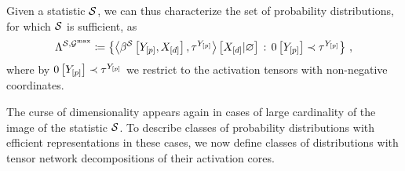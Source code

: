 Given a statistic $\mathcal{S}$, we can thus characterize the set of probability distributions, for which $\mathcal{S}$ is sufficient, as
\begin{align*} %
    \realizabledistsof{\sstat,\maxgraph}
    \coloneqq \left\{\normalizationof{\bencodingofat{\sstat}{\headvariables,\shortcatvariables},\hypercoreof{\headvariables}}{\shortcatvariables}
    \wcols \zerosat{\headvariables}\prec\hypercoreof{\headvariables} \right\} \, ,
\end{align*}
where by $0\left[Y_{[p]}\right]\prec\tau^{Y_{[p]}}$ we restrict to the activation tensors with non-negative coordinates.


\label{sec:computationActivationNetworks}

The curse of dimensionality appears again in cases of large cardinality of the image of the statistic $\mathcal{S}$.
To describe classes of probability distributions with efficient representations in these cases, we now define classes of distributions with tensor network decompositions of their activation cores.

